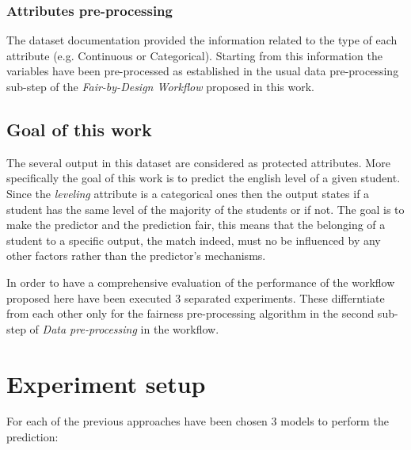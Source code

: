 \documentclass[12pt,a4paper,openright,twoside]{book}
\begin{document}
\subsubsection{Attributes pre-processing}

The dataset documentation provided the information related to the type of each attribute (e.g. Continuous or Categorical). Starting from this information the variables have been pre-processed as established in the usual data pre-processing sub-step of the \emph{Fair-by-Design Workflow} proposed in this work.


\subsection{Goal of this work}

The several output in this dataset are considered as protected attributes. More specifically the goal of this work is to predict the english level of a given student. Since the \emph{level\textunderscore ing} attribute is a categorical ones then the output states if a student has the same level of the majority of the students or if not. The goal is to make the predictor and the prediction fair, this means that the belonging of a student to a specific output, the match indeed, must no be influenced by any other factors rather than the predictor's mechanisms.

In order to have a comprehensive evaluation of the performance of the workflow proposed here have been executed 3 separated experiments. These differntiate from each other only for the fairness pre-processing algorithm in the second sub-step of \emph{Data pre-processing} in the workflow.

\section{Experiment setup}

For each of the previous approaches have been chosen 3 models to perform the prediction:
\end{document}

